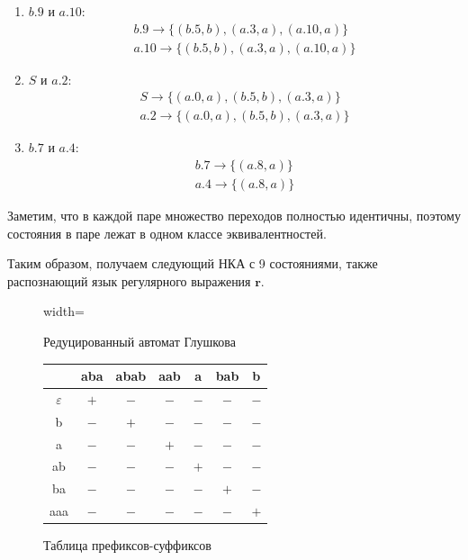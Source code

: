 \documentclass[a4paper, 12pt]{article}
\newcommand{\re}{\mathbf{r}}
\begin{document}
    \begin{enumerate}
      \itemsep -0.8pt
      \item $b.9$ и $a.10$:
        \begin{gather*}
          b.9 \to \{(b.5, b), (a.3, a), (a.10, a)\}\\
          a.10 \to \{(b.5, b), (a.3, a), (a.10, a)\}
        \end{gather*}
      \item $S$ и $a.2$:
        \begin{gather*}
          S \to \{(a.0, a), (b.5, b), (a.3, a)\}\\
          a.2 \to \{(a.0, a), (b.5, b), (a.3, a)\}
        \end{gather*}
      \item $b.7$ и $a.4$:
        \begin{gather*}
          b.7 \to \{(a.8, a)\}\\
          a.4 \to \{(a.8, a)\}
        \end{gather*}
    \end{enumerate}

    Заметим, что в каждой паре множество переходов полностью идентичны, поэтому состояния в паре лежат в одном классе эквивалентностей.

    Таким образом, получаем следующий НКА с 9 состояниями, также распознающий язык регулярного выражения $\re$.

    \begin{figure}[H]
      \centering
      \begin{adjustbox}{width=\textwidth}
      
      \end{adjustbox}
      \caption{Редуцированный автомат Глушкова}
      \label{fig:nfa:glushkov-reduced}
    \end{figure}

    \begin{figure}[H]
      \centering
      \begin{tabular}{|c|c|c|c|c|c|c|}
        \hline
        & aba & abab & aab & a & bab & b \\
        \hline
        $\varepsilon$ & $+$ & $-$ & $-$ & $-$ & $-$ & $-$ \\
        \hline
        b & $-$ & $+$ & $-$ & $-$ & $-$ & $-$ \\
        \hline
        a & $-$ & $-$ & $+$ & $-$ & $-$ & $-$ \\
        \hline
        ab & $-$ & $-$ & $-$ & $+$ & $-$ & $-$ \\
        \hline
        ba & $-$ & $-$ & $-$ & $-$ & $+$ & $-$ \\
        \hline
        aaa & $-$ & $-$ & $-$ & $-$ & $-$ & $+$\\
        \hline
      \end{tabular}
      \caption{Таблица префиксов-суффиксов}
      \label{table:nfa-prefix-suffix}
    \end{figure}
\end{document}
